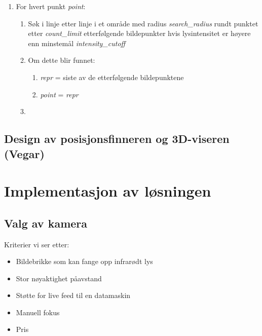 		\begin{enumerate}
			\item For hvert punkt {\it point}:
				\begin{enumerate}
					\item S\o k i linje etter linje i et omr\aa de med radius {\it search\_radius} rundt punktet etter {\it count\_limit} etterf\o lgende bildepunkter hvis lysintensitet er h\o yere enn minstem\aa l {\it intensity\_cutoff}
					\item Om dette blir funnet:
						\begin{enumerate}
							\item {\it repr} = siste av de etterf\o lgende bildepunktene
							\item {\it point} = {\it repr}
						\end{enumerate}
					\item
				\end{enumerate}
		\end{enumerate}
	
	\subsection{Design av posisjonsfinneren og 3D-viseren (Vegar)}
	
		
	
\section{Implementasjon av l\o  sningen}

	\subsection{Valg av kamera}
	
		Kriterier vi ser etter:
		
		\begin{itemize}
			\item Bildebrikke som kan fange opp infrar\o dt lys
			\item Stor n\o yaktighet p\aa \space avstand
			\item St\o tte for live feed til en datamaskin
			\item Manuell fokus
			\item Pris
		\end{itemize}
		
